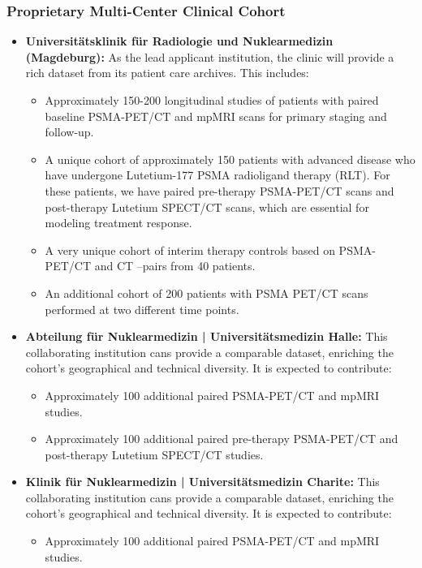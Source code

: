 \documentclass[11pt, a4paper]{article}
\begin{document}
\subsubsection{Proprietary Multi-Center Clinical Cohort}
\begin{itemize}
    \item \textbf{Universitätsklinik für Radiologie und Nuklearmedizin (Magdeburg):} As the lead applicant institution, the clinic will provide a rich dataset from its patient care archives. This includes:
    \begin{itemize}
        \item Approximately 150-200 longitudinal studies of patients with paired baseline PSMA-PET/CT and mpMRI scans for primary staging and follow-up.
        \item A unique cohort of approximately 150 patients with advanced disease who have undergone Lutetium-177 PSMA radioligand therapy (RLT). For these patients, we have paired pre-therapy PSMA-PET/CT scans and post-therapy Lutetium SPECT/CT scans, which are essential for modeling treatment response.
        \item A very unique cohort of interim therapy controls based on PSMA-PET/CT and CT –pairs from 40 patients.
        \item An additional cohort of 200 patients with PSMA PET/CT scans performed at two different time points.
    \end{itemize}
    \item \textbf{Abteilung für Nuklearmedizin | Universitätsmedizin Halle:} This collaborating institution cans provide a comparable dataset, enriching the cohort’s geographical and technical diversity. It is expected to contribute:
    \begin{itemize}
        \item Approximately 100 additional paired PSMA-PET/CT and mpMRI studies.
        \item Approximately 100 additional paired pre-therapy PSMA-PET/CT and post-therapy Lutetium SPECT/CT studies.
    \end{itemize}
    \item \textbf{Klinik für Nuklearmedizin | Universitätsmedizin Charite:} This collaborating institution cans provide a comparable dataset, enriching the cohort’s geographical and technical diversity. It is expected to contribute:
    \begin{itemize}
        \item Approximately 100 additional paired PSMA-PET/CT and mpMRI studies.

\end{itemize}
\end{itemize}
\end{document}

